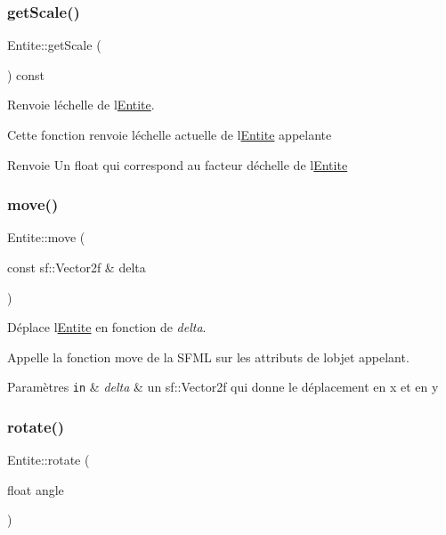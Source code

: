\subsubsection{\texorpdfstring{get\+Scale()}{getScale()}}
{\footnotesize\ttfamily Entite\+::get\+Scale (\begin{DoxyParamCaption}{ }\end{DoxyParamCaption}) const}



Renvoie l\textquotesingle{}échelle de l\textquotesingle{}\hyperlink{class_entite}{Entite}. 

Cette fonction renvoie l\textquotesingle{}échelle actuelle de l\textquotesingle{}\hyperlink{class_entite}{Entite} appelante \begin{DoxyReturn}{Renvoie}
Un {\ttfamily float} qui correspond au facteur d\textquotesingle{}échelle de l\textquotesingle{}\hyperlink{class_entite}{Entite} 
\end{DoxyReturn}
\mbox{\label{class_entite_ac409613f3cf67cae14babd4b16811c8f}} 
\subsubsection{\texorpdfstring{move()}{move()}}
{\footnotesize\ttfamily Entite\+::move (\begin{DoxyParamCaption}\item[{const sf\+::\+Vector2f \&}]{delta }\end{DoxyParamCaption})}



Déplace l\textquotesingle{}\hyperlink{class_entite}{Entite} en fonction de {\itshape delta}. 

Appelle la fonction move de la S\+F\+ML sur les attributs de l\textquotesingle{}objet appelant. 
\begin{DoxyParams}[1]{Paramètres}
\mbox{\tt in}  & {\em delta} & un {\ttfamily sf\+::\+Vector2f} qui donne le déplacement en x et en y \\
\hline
\end{DoxyParams}
\mbox{\label{class_entite_af1249039d313e4e691a109440663eae7}} 
\subsubsection{\texorpdfstring{rotate()}{rotate()}}
{\footnotesize\ttfamily Entite\+::rotate (\begin{DoxyParamCaption}\item[{float}]{angle }\end{DoxyParamCaption})}



